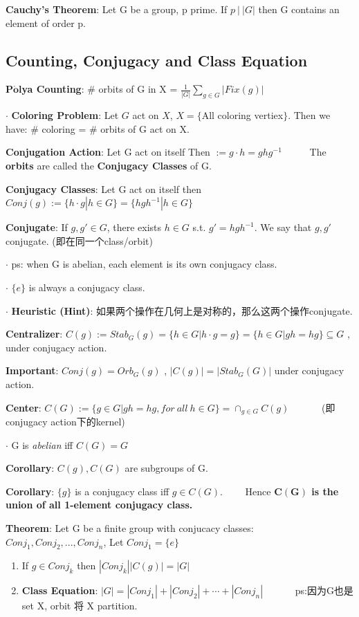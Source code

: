 \documentclass[11pt]{article}
\begin{document}
\textbf{Cauchy's Theorem}: Let G be a group, p prime. If $p \ | \ |G|$ then G contains an element of order p.

\subsection{Counting, Conjugacy and Class Equation}

\textbf{P$\mathbf{\acute{o}}$lya Counting}: \# orbits of G in X = $\frac{1}{|G|}\sum\limits_{g\in G}|Fix(g)|$

$\cdot$ \textbf{Coloring Problem}: Let $G$ act on $X$, $X=\{$All coloring vertiex$\}$. Then we have: \# coloring = \# orbits of G act on X.

\textbf{Conjugation Action}: Let G act on itself Then $:=g\cdot h=ghg^{-1}$ \ \ \ \ \ The \textbf{orbits} are called the \textbf{Conjugacy Classes} of G.

\textbf{Conjugacy Classes}: Let G act on itself then $Conj(g):=\{h \cdot g | h\in G\}=\{hgh^{-1}| h\in G\}$

\textbf{Conjugate}: If $g,g'\in G$, there exists $h\in G$ s.t. $g'=hgh^{-1}$. We say that $g,g'$ conjugate. (即在同一个class/orbit)

$\cdot$ ps: when G is abelian, each element is its own conjugacy class.

$\cdot$ $\{e\}$ is always a conjugacy class.

$\cdot$ \textbf{Heuristic (Hint)}: 如果两个操作在几何上是对称的，那么这两个操作conjugate.

\textbf{Centralizer}: $C(g):=Stab_G(g)=\{h\in G|h\cdot g=g\}=\{h\in G | gh=hg\}\subseteq G$ , under conjugacy action.

\textbf{Important}: $Conj(g)=Orb_G(g)$ , $|C(g)|=|Stab_G(G)|$ under conjugacy action.

\textbf{Center}: $C(G):=\{g\in G | gh=hg,for \ all \ h\in G\}=\cap_{g\in G}C(g)$ \ \ \ \ \ \ (即conjugacy action下的kernel)

$\cdot$ G is \textit{abelian} iff $C(G)=G$

\textbf{Corollary}: $C(g),C(G)$ are subgroups of G.

\textbf{Corollary}: $\{g\}$ is a conjugacy class iff $g\in C(G)$. \ \ \ \ Hence \textbf{$\mathbf{C(G)}$ is the union of all 1-element conjugacy class.}

\textbf{Theorem}: Let G be a finite group with conjucacy classes: $Conj_1,Conj_2,...,Conj_n$, Let $Conj_1=\{e\}$
\begin{enumerate}[itemsep=-2pt, topsep=-2pt]
    \item If $g\in Conj_k$ then $|Conj_k||C(g)|=|G|$
    \item \textbf{Class Equation}: $|G|=|Conj_1|+|Conj_2|+\cdots+|Conj_n|$ \ \ \ \ \ \ ps:因为G也是set X, orbit 将 X partition.
\end{enumerate}
\end{document}
